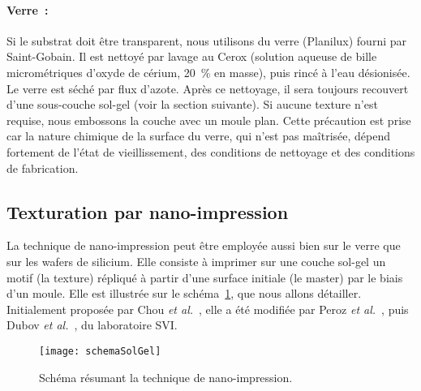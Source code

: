 \paragraph*{Verre~:} Si le substrat doit être transparent, nous utilisons du verre (Planilux) fourni par Saint-Gobain. Il est nettoyé par lavage au Cerox (solution aqueuse de bille micrométriques d'oxyde de cérium, 20~\% en masse), puis rincé à l'eau désionisée. Le verre est séché par flux d'azote. Après ce nettoyage, il sera toujours recouvert d'une sous-couche sol-gel (voir la section suivante). Si aucune texture n'est requise, nous embossons la couche avec un moule plan. Cette précaution est prise car la nature chimique de la surface du verre, qui n'est pas maîtrisée, dépend fortement de l'état de vieillissement, des conditions de nettoyage et des conditions de fabrication.\par 

	\subsection{Texturation par nano-impression}
La technique de nano-impression peut être employée aussi bien sur le verre que sur les wafers de silicium. Elle consiste à imprimer sur une couche sol-gel un motif (la texture) répliqué à partir d'une surface initiale (le master) par le biais d'un moule. Elle est illustrée sur le schéma~\ref{schemaSolGel}, que nous allons détailler. Initialement proposée par Chou \textit{et al.}~\cite{chou1996nanoimprint}, elle a été modifiée par Peroz \textit{et al.}~\cite{peroz2009nanoimprint}, puis Dubov \textit{et al.}~\cite{dubov2013superhydrophobic}, du laboratoire SVI.\par 
\begin{figure}[!htb]
\centering
\texttt{[image: schemaSolGel]}
\caption{Schéma résumant la technique de nano-impression.}
\label{schemaSolGel}
\end{figure}
